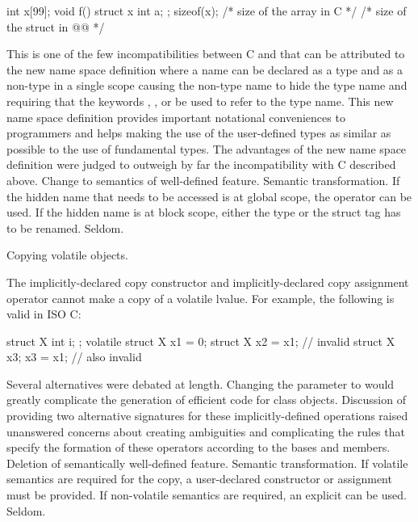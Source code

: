 \begin{codeblock}
int x[99];
void f() {
  struct x { int a; };
  sizeof(x);  /* size of the array in C */
  /* size of the struct in @\textit{\textrm{\Cpp{}}}@ */
}
\end{codeblock}
\rationale
This is one of the few incompatibilities between C and \Cpp{} that
can be attributed to the new \Cpp{} name space definition where a
name can be declared as a type and as a non-type in a single scope
causing the non-type name to hide the type name and requiring that
the keywords , ,  or  be used to refer to the type name.
This new name space definition provides important notational
conveniences to \Cpp{} programmers and helps making the use of the
user-defined types as similar as possible to the use of fundamental
types.
The advantages of the new name space definition were judged to
outweigh by far the incompatibility with C described above.
\effect
Change to semantics of well-defined feature.
\difficulty
Semantic transformation.
If the hidden name that needs to be accessed is at global scope,
the \tcode{::} \Cpp{} operator can be used.
If the hidden name is at block scope, either the type or the struct
tag has to be renamed.
\howwide
Seldom.

\change Copying volatile objects.

The implicitly-declared copy constructor and
implicitly-declared copy assignment operator
cannot make a copy of a volatile lvalue.
For example, the following is valid in ISO C:

\begin{codeblock}
struct X { int i; };
volatile struct X x1 = {0};
struct X x2 = x1;               // invalid \Cpp{}
struct X x3;
x3 = x1;                        // also invalid \Cpp{}
\end{codeblock}

\rationale
Several alternatives were debated at length.
Changing the parameter to
would greatly complicate the generation of
efficient code for class objects.
Discussion of
providing two alternative signatures for these
implicitly-defined operations raised
unanswered concerns about creating
ambiguities and complicating
the rules that specify the formation of
these operators according to the bases and
members.
\effect
Deletion of semantically well-defined feature.
\difficulty
Semantic transformation.
If volatile semantics are required for the copy,
a user-declared constructor or assignment must
be provided.
If non-volatile semantics are required,
an explicit
can be used.
\howwide
Seldom.

